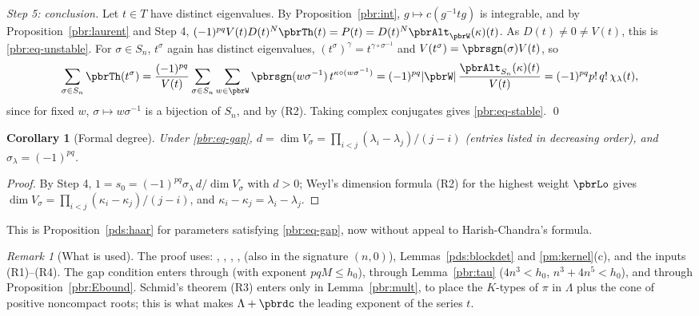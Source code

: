 \documentclass[10pt]{amsart}
\newtheorem{corollary}[theorem]{Corollary}
\theoremstyle{definition}
\theoremstyle{remark}
\newtheorem{remark}[theorem]{Remark}
\begin{document}
\emph{Step 5: conclusion.} Let $t\in T$ have distinct eigenvalues. By Proposition~\ref{pbr:int},
$g\mapsto c(g^{-1}tg)$ is integrable, and by Proposition~\ref{pbr:laurent} and Step 4,
$(-1)^{pq}V(t)D(t)^N\pbrTh(t)=P(t)=D(t)^N\pbrAlt_{\pbrW}(\kappa)(t)$. As $D(t)\ne0\ne V(t)$, this is
\eqref{pbr:eq-unstable}. For $\sigma\in S_n$, $t^\sigma$ again has distinct eigenvalues,
$(t^\sigma)^\gamma=t^{\gamma\circ\sigma^{-1}}$ and $V(t^\sigma)=\pbrsgn(\sigma)V(t)$, so
\[
\sum_{\sigma\in S_n}\pbrTh(t^\sigma)=\frac{(-1)^{pq}}{V(t)}\sum_{\sigma\in S_n}\sum_{w\in\pbrW}
\pbrsgn(w\sigma^{-1})\,t^{\kappa\circ(w\sigma^{-1})}=(-1)^{pq}|\pbrW|\,\frac{\pbrAlt_{S_n}(\kappa)(t)}
{V(t)}=(-1)^{pq}p!\,q!\,\chi_\lambda(t),
\]
since for fixed $w$, $\sigma\mapsto w\sigma^{-1}$ is a bijection of $S_n$, and by (R2). Taking complex
conjugates gives \eqref{pbr:eq-stable}. \qed

\begin{corollary}[Formal degree]\label{pbr:degree}
Under \eqref{pbr:eq-gap}, $d=\dim V_\sigma=\prod_{i<j}(\lambda_i-\lambda_j)/(j-i)$ (entries listed in
decreasing order), and $\sigma_\lambda=(-1)^{pq}$.
\end{corollary}
\begin{proof}
By Step 4, $1=s_0=(-1)^{pq}\sigma_\lambda\,d/\dim V_\sigma$ with $d>0$; Weyl's dimension formula (R2)
for the highest weight $\pbrLo$ gives $\dim V_\sigma=\prod_{i<j}(\kappa_i-\kappa_j)/(j-i)$, and
$\kappa_i-\kappa_j=\lambda_i-\lambda_j$.
\end{proof}
This is Proposition~\ref{pds:haar} for parameters satisfying \eqref{pbr:eq-gap}, now without
appeal to Harish-Chandra's formula.

\begin{remark}[What is used]\label{pbr:rem-used}
The proof uses: {\cite[Theorem~3.17]{P49}}, {\cite[Lemma~3.25]{P49}}, {\cite[Lemma~3.18]{P49}},
{\cite[Corollary~3.19]{P49}}, {\cite[Proposition~3.21]{P49}} (also in the signature $(n,0)$),
Lemmas~\ref{pds:blockdet} and \ref{pm:kernel}(c), and the inputs (R1)--(R4). The gap condition
enters through {\cite[Lemma~3.25]{P49}} (with exponent $pqM\le h_0$), through Lemma~\ref{pbr:tau}
($4n^3<h_0$, $n^3+4n^5<h_0$), and through Proposition~\ref{pbr:Ebound}. Schmid's theorem (R3) enters
only in Lemma~\ref{pbr:mult}, to place the $K$-types of $\pi$ in $\Lambda$ plus the cone of positive
noncompact roots; this is what makes $\Lambda+\pbrdc$ the leading exponent of the series $t$.
\end{remark}
\end{document}
